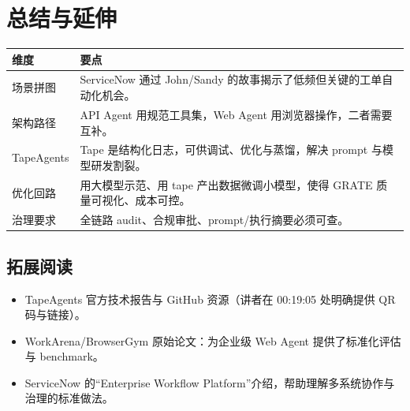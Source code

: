 \section{总结与延伸}
\begin{tabular}{@{}p{4.5cm}p{11cm}@{}}
\toprule
维度 & 要点 \\
\midrule
场景拼图 & ServiceNow 通过 John/Sandy 的故事揭示了低频但关键的工单自动化机会。 \\
架构路径 & API Agent 用规范工具集，Web Agent 用浏览器操作，二者需要互补。 \\
TapeAgents & Tape 是结构化日志，可供调试、优化与蒸馏，解决 prompt 与模型研发割裂。 \\
优化回路 & 用大模型示范、用 tape 产出数据微调小模型，使得 GRATE 质量可视化、成本可控。 \\
治理要求 & 全链路 audit、合规审批、prompt/执行摘要必须可查。 \\
\bottomrule
\end{tabular}

\subsection{拓展阅读}
\begin{itemize}
    \item TapeAgents 官方技术报告与 GitHub 资源（讲者在 00:19:05 处明确提供 QR 码与链接）。\newline
    \item WorkArena/BrowserGym 原始论文：为企业级 Web Agent 提供了标准化评估与 benchmark。
    \item ServiceNow 的“Enterprise Workflow Platform”介绍，帮助理解多系统协作与治理的标准做法。
\end{itemize}



